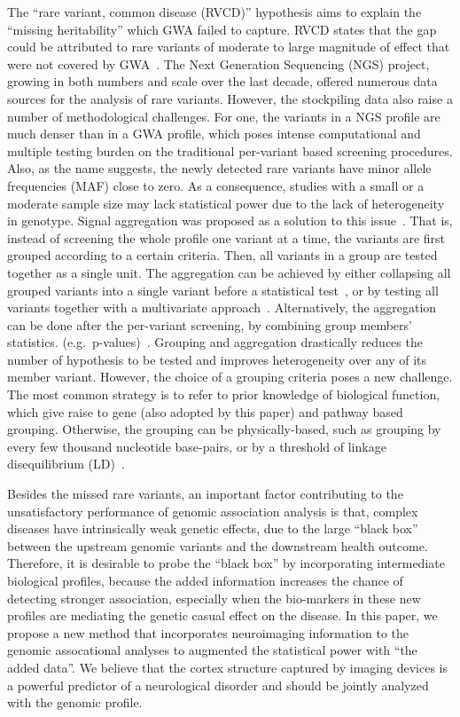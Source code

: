 The “rare variant, common disease (RVCD)” hypothesis aims to explain the “missing heritability” which GWA failed to capture. RVCD states that the gap could be attributed to rare variants of moderate to large magnitude of effect that were not covered by GWA~\cite{RVCD1}. The Next Generation Sequencing (NGS) project, growing in both numbers and scale over the last decade, offered numerous data sources for the analysis of rare variants. However, the stockpiling data also raise a number of methodological challenges. For one, the variants in a NGS profile are much denser than in a GWA profile, which poses intense computational and multiple testing burden on the traditional per-variant based screening procedures. Also, as the name suggests, the newly detected rare variants have minor allele frequencies (MAF) close to zero. As a consequence, studies with a small or a moderate sample size may lack statistical power due to the lack of heterogeneity in genotype. Signal aggregation was proposed as a solution to this issue~\cite{Burden1, UST1, UST2, SKAT, GCTA, Dai:2015, plink1}. That is, instead of screening the whole profile one variant at a time, the variants are first grouped according to a certain criteria. Then, all variants in a group are tested together as a single unit. The aggregation can be achieved by either collapsing all grouped variants into a single variant before a statistical test~\cite{Burden1}, or by testing all variants together with a multivariate approach~\cite{UST1, UST2, SKAT, GCTA}. Alternatively, the aggregation can be done after the per-variant screening, by combining group members’ statistics. (e.g.\ p-values)~\cite{Dai:2015, plink1}. Grouping and aggregation drastically reduces the number of hypothesis to be tested and improves heterogeneity over any of its member variant. However, the choice of a grouping criteria poses a new challenge. The most common strategy is to refer to prior knowledge of biological function, which give raise to gene (also adopted by this paper) and pathway based grouping. Otherwise, the grouping can be physically-based, such as grouping by every few thousand nucleotide base-pairs, or by a threshold of linkage disequilibrium (LD)~\cite{plink1}.

Besides the missed rare variants, an important factor contributing to the unsatisfactory performance of genomic association analysis is that, complex diseases have intrinsically weak genetic effects, due to the large ``black box'' between the upstream genomic variants and the downstream health outcome. Therefore, it is desirable to probe the ``black box'' by incorporating intermediate biological profiles, because the added information increases the chance of detecting stronger association, especially when the bio-markers in these new profiles are mediating the genetic casual effect on the disease. In this paper, we propose a new method that incorporates neuroimaging information to the genomic assocational analyses to augmented the statistical power with ``the added data''. We believe that the cortex structure captured by imaging devices is a powerful predictor of a neurological disorder and should be jointly analyzed with the genomic profile.


